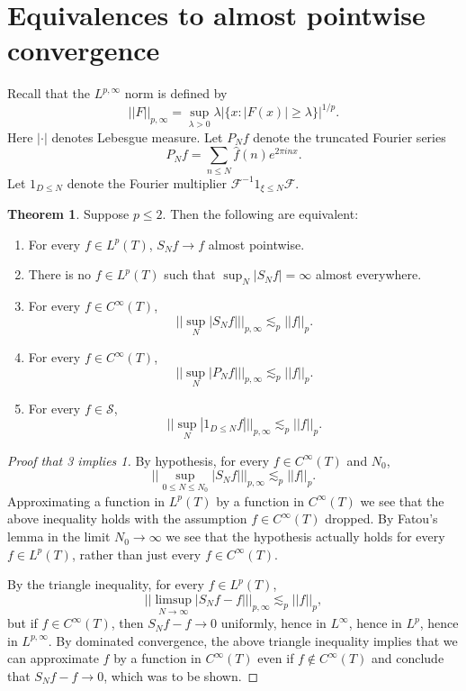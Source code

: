 \documentclass[12pt]{report}
\newcommand{\Sch}{\mathcal{S}}
\theoremstyle{definition}
\newtheorem{theorem}{Theorem}[chapter]
\begin{document}
\section{Equivalences to almost pointwise convergence}
Recall that the $L^{p,\infty}$ norm is defined by
$$||F||_{p,\infty} = \sup_{\lambda > 0} \lambda|\{x: |F(x)| \geq \lambda\}|^{1/p}.$$
Here $|\cdot|$ denotes Lebesgue measure.
Let $P_Nf$ denote the truncated Fourier series
$$P_Nf = \sum_{n \leq N} \hat f(n) e^{2\pi inx}.$$
Let $1_{D \leq N}$ denote the Fourier multiplier $\mathcal F^{-1}1_{\xi \leq N} \mathcal F$.


\begin{theorem}
Suppose $p \leq 2$. Then the following are equivalent:
\begin{enumerate}
\item For every $f \in L^p(T)$, $S_Nf \to f$ almost pointwise.
\item There is no $f \in L^p(T)$ such that $\sup_N |S_Nf| = \infty$ almost everywhere.
\item For every $f \in C^\infty(T)$,
$$||\sup_N |S_Nf| ||_{p,\infty} \lesssim_p ||f||_p.$$
\item For every $f \in C^\infty(T)$,
$$||\sup_N |P_Nf| ||_{p,\infty} \lesssim_p ||f||_p.$$
\item For every $f \in \Sch$,
$$||\sup_N |1_{D \leq N}f|||_{p,\infty} \lesssim_p ||f||_p.$$
\end{enumerate}
\end{theorem}
\begin{proof}[Proof that 3 implies 1]
By hypothesis, for every $f \in C^\infty(T)$ and $N_0$,
$$||\sup_{0 \leq N \leq N_0} |S_Nf|||_{p,\infty} \lesssim_p ||f||_p.$$
Approximating a function in $L^p(T)$ by a function in $C^\infty(T)$ we see that the above inequality holds with the assumption $f \in C^\infty(T)$ dropped.
By Fatou's lemma in the limit $N_0 \to \infty$ we see that the hypothesis actually holds for every $f \in L^p(T)$, rather than just every $f \in C^\infty(T)$.

By the triangle inequality, for every $f \in L^p(T)$,
$$||\limsup_{N \to \infty} |S_Nf - f|||_{p, \infty} \lesssim_p ||f||_p,$$
but if $f \in C^\infty(T)$, then $S_Nf - f \to 0$ uniformly, hence in $L^\infty$, hence in $L^p$, hence in $L^{p, \infty}$.
By dominated convergence, the above triangle inequality implies that we can approximate $f$ by a function in $C^\infty(T)$ even if $f \notin C^\infty(T)$ and conclude that $S_Nf - f \to 0$, which was to be shown.
\end{proof}
\end{document}
